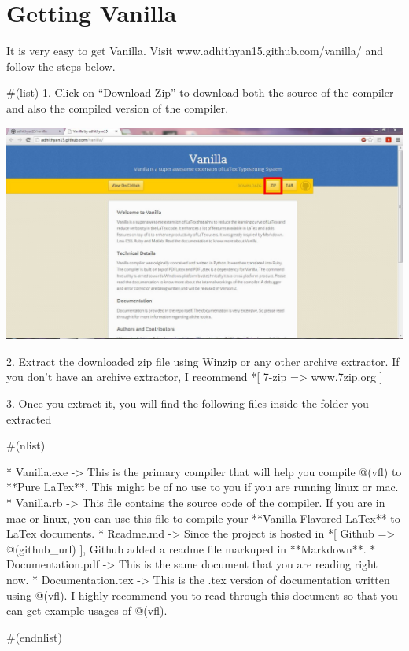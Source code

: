\documentclass{article}
\begin{document}
\section*{Getting Vanilla}

It is very easy to get Vanilla. Visit www.adhithyan15.github.com/vanilla/ and follow the steps below. 

#(list)
1. Click on ``Download Zip'' to download both the source of the compiler and also the compiled version of the compiler. \vspace{5pt}

\includegraphics[scale=0.5]{VanillaGithub}

2. Extract the downloaded zip file using Winzip or any other archive extractor. If you don't have an archive extractor, I recommend *[ 7-zip => www.7zip.org ]

3. Once you extract it, you will find the following files inside the folder you extracted

#(nlist)

* Vanilla.exe  -> This is the primary compiler that will help you compile @(vfl) to **Pure LaTex**. This might be of no use to you if you are running linux or mac. 
* Vanilla.rb  ->  This file contains the source code of the compiler. If you are in mac or linux, you can use this file to compile your **Vanilla Flavored LaTex** to LaTex documents.
* Readme.md ->  Since the project is hosted in *[ Github => @(github_url) ], Github added a readme file markuped in **Markdown**.
* Documentation.pdf ->  This is the same document that you are reading right now. 
* Documentation.tex ->  This is the .tex version of documentation written using @(vfl). I highly recommend you to read through this document so that you can get example usages of @(vfl). 

#(endnlist)

 
\end{document}
